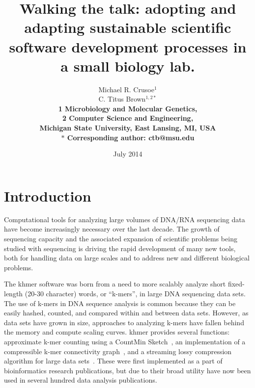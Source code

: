\documentclass[12pt]{article}
\date{July 2014}
\title{Walking the talk: adopting and adapting sustainable scientific software
  development processes in a small biology lab.}
\author{Michael R. Crusoe$^{1}$\\
C. Titus Brown$^{1,2\ast}$\\
\small \bf{1} Microbiology and Molecular Genetics,\\
\small \bf{2} Computer Science and Engineering,\\
\small Michigan State University, East Lansing, MI, USA\\
\small $\ast$ Corresponding author: ctb@msu.edu}
\begin{document}
\maketitle
\thispagestyle{firststyle}


\setlength{\parindent}{0pt}
\setlength{\parskip}{0.70ex}

\section{Introduction}
Computational tools for analyzing large volumes of DNA/RNA sequencing data
have become increasingly necessary over the last decade.  The growth
of sequencing capacity and the associated expansion of scientific
problems being studied with sequencing is driving the rapid development of
many new tools, both for handling data on large scales and to address
new and different biological problems.

The khmer software was born from a need to more scalably analyze short
fixed-length (20-30 character) words, or ``k-mers'', in large DNA
sequencing data sets. The use of k-mers in DNA sequence analysis is
common because they can be easily hashed, counted, and compared within
and between data sets. However, as data sets have grown in size,
approaches to analyzing k-mers have fallen behind the memory and
compute scaling curves. khmer provides several functions: approximate
k-mer counting using a CountMin Sketch~\cite{Zhang2014}, an
implementation of a compressible k-mer connectivity
graph~\cite{Pell2012}, and a streaming lossy compression algorithm for
large data sets~\cite{diginorm}.  These were first implemented as a
part of bioinformatics research publications, but due to their broad
utility have now been used in several hundred data analysis
publications.
\end{document}
